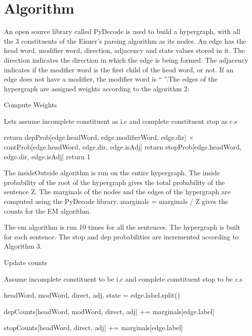 \documentclass{book}
\begin{document}
\section{Algorithm}

An open source library called PyDecode is used to build a hypergraph, with all the 3 constituents of the Eisner's parsing algorithm as its nodes. An edge has the head word, modifier word, direction, adjacency and state values stored in it. The direction indicates the direction in which the edge is being formed. The adjacency indicates if the modifier word is the first child of the head word, or not. If an edge does not have a modifier, the modifier word is `` ''.The edges of the hypergraph are assigned weights according to the algorithm 2:

\begin{algorithm}
\caption{Compute Weights}
\begin{algorithmic}


\State Lets assume incomplete constituent as i.c and complete constituent stop as c.s

   \State return depProb[edge.headWord, edge.modifierWord, edge.dir] $\times$ contProb[edge.headWord, edge.dir, edge.isAdj]
   \State return stopProb[edge.headWord, edge.dir, edge.isAdj]
\Else
   \State return 1
\EndIf

\end{algorithmic}
\end{algorithm}

 The insideOutside algorithm is run on the entire hypergraph. The inside probability of the root of the hypergraph gives the total probability of the sentence Z. The marginals of the nodes and the edges of the hypergraph are computed using the PyDecode library. marginals = marginals / Z gives the counts for the EM algorithm.

The em algorithm is run 10 times for all the sentences. The hypergraph is built for each sentence. The stop and dep probabilities are incremented according to Algorithm 3.


\begin{algorithm}
\caption{Update counts}
\begin{algorithmic}

\State Assume incomplete constituent to be i.c and complete constituent stop to be c.s


   \State headWord, modWord, direct, adj, state = edge.label.split()

          \State depCounts[headWord, modWord, direct, adj] += marginals[edge.label]
        \EndIf

          \State stopCounts[headWord, direct, adj] += marginals[edge.label]
        \EndIf

\EndFor

\end{algorithmic}
\end{algorithm}
\end{document}
